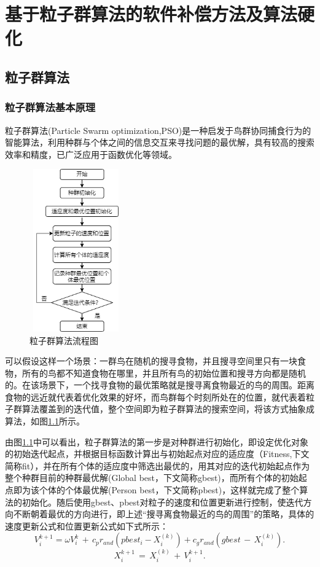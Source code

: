 
\chapter{基于粒子群算法的软件补偿方法及算法硬化}
\section{粒子群算法}
\label{粒子群算法}
\subsection{粒子群算法基本原理}

粒子群算法(Particle Swarm optimization,PSO)是一种启发于鸟群协同捕食行为的智能算法，利用种群与个体之间的信息交互来寻找问题的最优解，具有较高的搜索效率和精度\cite{潘红丽2022基于改进粒子群算法的垃圾清运车辆低碳路径规划}，已广泛应用于函数优化等领域\cite{2022Environmental}。
\begin{figure}[htb]
  \centering
  \includegraphics[width=4cm,height=7cm]{fig/4-fig/粒子群算法流程图.png}
  \caption{粒子群算法流程图}
  \label{fig:粒子群算法流程图}
\end{figure}

可以假设这样一个场景：一群鸟在随机的搜寻食物，并且搜寻空间里只有一块食物，所有的鸟都不知道食物在哪里，并且所有鸟的初始位置和搜寻方向都是随机的。在该场景下，一个找寻食物的最优策略就是搜寻离食物最近的鸟的周围。距离食物的远近就代表着优化效果的好坏，而鸟群每个时刻所处在的位置，就代表着粒子群算法覆盖到的迭代值，整个空间即为粒子群算法的搜索空间，将该方式抽象成算法，如图\ref{fig:粒子群算法流程图}所示。

由图\ref{fig:粒子群算法流程图}中可以看出，粒子群算法的第一步是对种群进行初始化，即设定优化对象的初始迭代起点，并根据目标函数计算出与初始起点对应的适应度（Fitness,下文简称fit），并在所有个体的适应度中筛选出最优的，用其对应的迭代初始起点作为整个种群目前的种群最优解(Global best，下文简称gbest)，而所有个体的初始起点即为该个体的个体最优解(Person best，下文简称pbest)，这样就完成了整个算法的初始化。随后使用gbest、pbest对粒子的速度和位置更新进行控制，使迭代方向不断朝着最优的方向进行，即上述“搜寻离食物最近的鸟的周围”的策略，具体的速度更新公式和位置更新公式如下式所示：
\begin{equation}\label{eq:粒子群算法速度更新}
  V^{k+1}_i=\omega V^{k}_i\,+\,c_pr_{and}(pbest_i-X^{(k)}_i)+c_gr_{and}(gbest\,-\,X^{(k)}_i).
\end{equation}
\begin{equation}\label{eq:粒子群算法位置新}
    X^{k+1}_i\,=\,X^{(k)}_i\,+\,V_i^{k+1}.
\end{equation}

